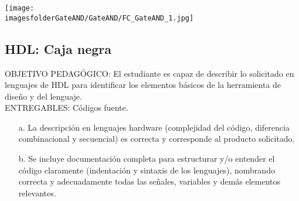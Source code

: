 		\begin{center}
			\texttt{[image: \\imagesfolderGateAND/GateAND/FC\_GateAND\_1.jpg]}%
		\end{center}
\subsection{HDL: Caja negra}
\scriptsize
	\begin{tcolorbox}[enhanced,title=PRODUCTO DE CALIDAD:,colframe=colorA1,colback=colorA2,arc=0mm,colbacktitle=white,fonttitle=\bfseries,coltitle=white,attach boxed title to top left={xshift=3.2mm,yshift=-0.50mm},boxed title style={skin=enhancedfirst jigsaw,size=small,arc=0mm,bottom=1mm,interior style={fill=none,top color=color2,bottom color=color2},,boxrule=0pt},boxrule=0pt]
		OBJETIVO PEDAGÓGICO: El estudiante es capaz de describir lo solicitado en lenguajes de HDL para identificar los elementos básicos de la herramienta de diseño y del lenguaje. \\
		ENTREGABLES: Códigos fuente.
		\begin{enumerate}
			\item[a.] La descripción en lenguajes hardware (complejidad del código, diferencia combinacional y secuencial) es correcta y corresponde al producto solicitado.
			\item[b.] Se incluye documentación completa para estructurar y/o entender el código claramente (indentación y sintaxis de los lenguajes), nombrando correcta y adecuadamente todas las señales, variables y demás elementos relevantes. 
		\end{enumerate}
	\end{tcolorbox}

\normalsize

	

